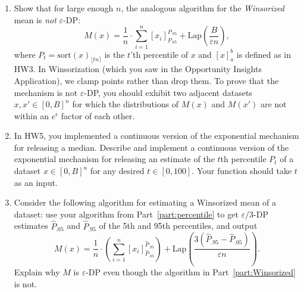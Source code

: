 \documentclass[11pt]{article}
\theoremstyle{plain}
\theoremstyle{definition}
\theoremstyle{solution}
\newcommand{\sort}{\mathrm{sort}}
\begin{document}
\begin{enumerate}[leftmargin=*]
\begin{enumerate}
\item Show that for large enough $n$, the analogous algorithm for the {\em Winsorized} mean is {\em not} $\varepsilon$-DP:
$$M(x) = \frac{1}{n}\cdot \sum_{i=1}^n \left[x_i\right]_{P_{.05}}^{P_{.95}} +\mathrm{Lap}\left(\frac{B}{\varepsilon n}\right),$$
where $P_t = \sort(x)_{\lfloor tn\rceil}$ is the $t$'th percentile of $x$ and $[x]_a^b$ is defined as in HW3.
In Winsorization (which you saw in the Opportunity Insights Application), we clamp points rather than drop them. 
To prove that the mechanism is not $\varepsilon$-DP, you should exhibit two adjacent datasets $x,x'\in [0,B]^n$ for
which the distributions of $M(x)$ and $M(x')$ are not within an $e^{\epsilon}$ factor of each other. \label{part:Winsorized}

\item In HW5, you implemented a continuous version of the exponential mechanism for releasing a median.  Describe and implement a continuous version of the exponential mechanism for releasing an estimate
of the $t$th percentile $P_t$ of a dataset $x\in [0,B]^n$
for any desired $t\in [0,100]$. Your function should take $t$ as an input. \label{part:percentile} 


\iffalse
\item Implement the following $\varepsilon$-DP algorithm for estimating a Trimmed mean of a dataset: use your algorithm from Part~\ref{part:percentile} to get  $\varepsilon/3$-DP estimates
$\hat{P}_{.05}$ and $\hat{P}_{.95}$ of the 5th and 95th percentiles, drop all datapoints that lie outside the range $[\hat{P}_{.05},\hat{P}_{.95}]$, and then use the Laplace mechanism to compute an $(\varepsilon/3)$-DP mean of the trimmed data.  That is, your code should compute 
$$M(x) = \frac{1}{.9n}\cdot \left(\sum_{i : \hat{P}_{.05}\leq x_i \leq \hat{P}_{.95}} x_i\right)
+ \mathrm{Lap}\left(\frac{3(\hat{P}_{.95}-\hat{P}_{.05})}{0.9\varepsilon n}\right).$$
\label{part:ExpTrimLap}
\fi

\item Consider the following algorithm for estimating a Winsorized mean of a dataset: 
use your algorithm from Part~\ref{part:percentile} to get  $\varepsilon/3$-DP estimates
$\hat{P}_{.05}$ and $\hat{P}_{.95}$ of the 5th and 95th percentiles,
and output
$$M(x) = \frac{1}{n}\cdot \left(\sum_{i=1}^n \left[x_i\right]_{\hat{P}_{.05}}^{\hat{P}_{.95}}\right)
+ \mathrm{Lap}\left(\frac{3(\hat{P}_{.95}-\hat{P}_{.05})}{\varepsilon n}\right).$$
Explain why $M$ is $\varepsilon$-DP even though the algorithm in Part~\ref{part:Winsorized} is not.  \label{part:ExpWinsorized}


\end{enumerate}
\end{enumerate}
\end{document}
